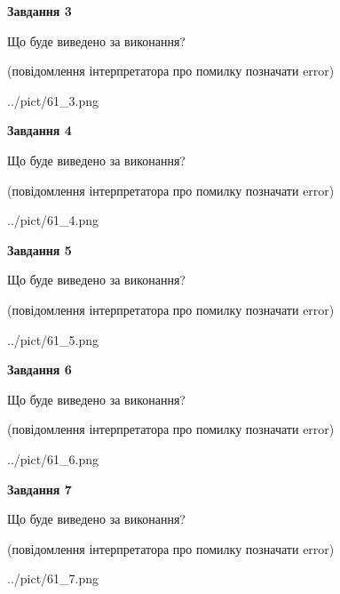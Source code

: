 \documentclass[12pt, ukrainian]{article}
\begin{document}
{\begin {large}
{\begin {center}\textbf{Завдання 3}\end {center}}\par
Що буде виведено за виконання?\par
 (повідомлення інтерпретатора про помилку позначати error)\par
\begin{center}
	{../pict/61_3.png}
\end{center}
\newpage

{\begin {center}\textbf{Завдання 4}\end {center}}\par
Що буде виведено за виконання?\par
 (повідомлення інтерпретатора про помилку позначати error)\par
\begin{center}
	{../pict/61_4.png}
\end{center}
\newpage

{\begin {center}\textbf{Завдання 5}\end {center}}\par
Що буде виведено за виконання?\par
 (повідомлення інтерпретатора про помилку позначати error)\par
\begin{center}
	{../pict/61_5.png}
\end{center}
\newpage

{\begin {center}\textbf{Завдання 6}\end {center}}\par
Що буде виведено за виконання?\par
 (повідомлення інтерпретатора про помилку позначати error)\par
\begin{center}
	{../pict/61_6.png}
\end{center}
\newpage

{\begin {center}\textbf{Завдання 7}\end {center}}\par
Що буде виведено за виконання?\par
 (повідомлення інтерпретатора про помилку позначати error)\par
\begin{center}
	{../pict/61_7.png}
\end{center}
\newpage


\end{large}}
\end{document}
